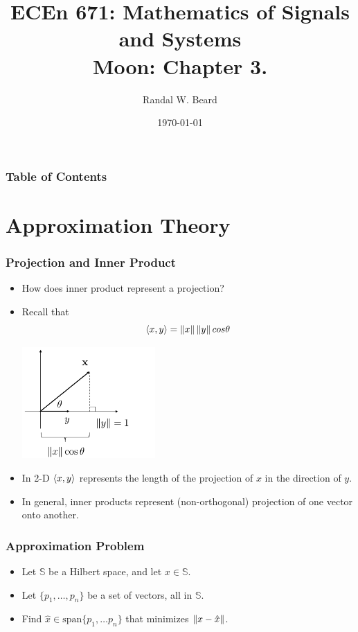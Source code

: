 \documentclass{beamer}
\title{ECEn 671: Mathematics of Signals and Systems \\ 
Moon: Chapter 3.}
\author{Randal W. Beard}
\institute{Brigham Young University}
\date{\today}
\begin{document}
\begin{frame}
	\titlepage
\end{frame}

\begin{frame}[t]
\frametitle{Table of Contents}
\tableofcontents
\end{frame}

\section{Approximation Theory}
\frame{\sectionpage}


\begin{frame}\frametitle{Projection and Inner Product}
\begin{itemize}
	\item How does inner product represent a projection?
	
	\item Recall that
	\[ 
	\left< x,y\right> = \left\| x \right\|\left\| y \right\| cos \theta 
	\]
	\begin{center}
	\includegraphics[width=2in]{figures/chap3_projection}
	\end{center}
	
	\item In 2-D $\left< x,y\right>$ represents the length of the projection of $x$ in the direction of $y$.

	\item In general, inner products represent (non-orthogonal) projection of one vector onto another.
\end{itemize}
\end{frame}


\begin{frame}\frametitle{Approximation Problem}
	\begin{itemize}
	\item Let $\mathbb{S}$ be a Hilbert space, and let $x \in \mathbb{S}$.

	\item Let $\{p_1, \dots, p_n \}$ be a set of vectors, all in $\mathbb{S}$.
	\item Find $\hat{x} \in \text{span}\{ p_1, \ldots p_n \}$ that minimizes $\left\|x-\hat{x}\right\|$.
	\end{itemize}
\end{frame}
\end{document}
